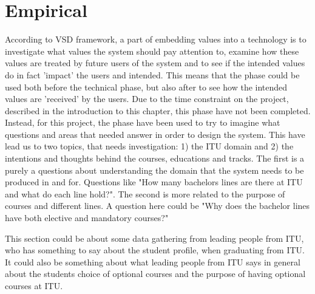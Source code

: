 \section{Empirical}
According to VSD framework, a part of embedding values into a technology is to investigate what values the system should pay attention to, examine how these values are treated by future users of the system and to see if the intended values do in fact 'impact' the users and intended. This means that the phase could be used both before the technical phase, but also after to see how the intended values are 'received' by the users. 
Due to the time constraint on the project, described in the introduction to this chapter, this phase have not been completed. Instead, for this project, the phase have been used to try to imagine what questions and areas that needed answer in order to design the system. This have lead us to two topics, that needs investigation: 1) the ITU domain and 2) the intentions and thoughts behind the courses, educations and tracks. The first is a purely a questions about understanding the domain that the system needs to be produced in and for. Questions like "How many bachelors lines are there at ITU and what do each line hold?". The second is more related to the purpose of courses and different lines. A question here could be "Why does the bachelor lines have both elective and mandatory courses?"

This section could be about some data gathering from leading people from ITU, who has something to say about the student profile, when graduating from ITU. It could also be something about what leading people from ITU says in general about the students choice of optional courses and the purpose of having optional courses at ITU. 




